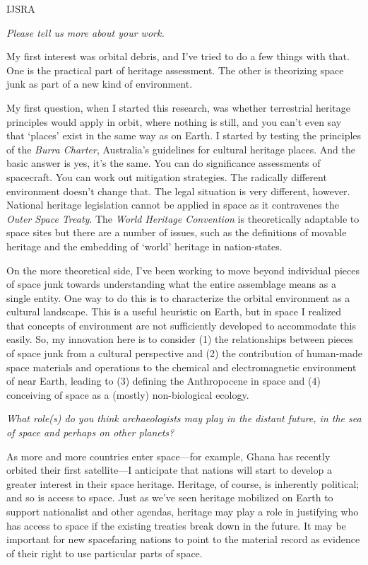 \begin{labeling}{IJSRA}
	\item[IJSRA] \emph{Please tell us more about your work.}

	\item[AG] My first interest was orbital debris, and I’ve tried to do a few things with that. One is the practical part of heritage assessment. The other is theorizing space junk as part of a new kind of environment.

	My first question, when I started this research, was whether terrestrial heritage principles would apply in orbit, where nothing is still, and you can’t even say that ‘places’ exist in the same way as on Earth. I started by testing the principles of the \emph{Burra Charter}, Australia’s guidelines for cultural heritage places. And the basic answer is yes, it’s the same. You can do significance assessments of spacecraft. You can work out mitigation strategies. The radically different environment doesn’t change that. The legal situation is very different, however. National heritage legislation cannot be applied in space as it contravenes the \emph{Outer Space Treaty}. The \emph{World Heritage Convention} is theoretically adaptable to space sites but there are a number of issues, such as the definitions of movable heritage and the embedding of ‘world’ heritage in nation-states.

	On the more theoretical side, I’ve been working to move beyond individual pieces of space junk towards understanding what the entire assemblage means as a single entity. One way to do this is to characterize the orbital environment as a cultural landscape. This is a useful heuristic on Earth, but in space I realized that concepts of environment are not sufficiently developed to accommodate this easily. So, my innovation here is to consider (1) the relationships between pieces of space junk from a cultural perspective and (2) the contribution of human-made space materials and operations to the chemical and electromagnetic environment of near Earth, leading to (3) defining the Anthropocene in space and (4) conceiving of space as a (mostly) non-biological ecology.

	\item[IJSRA] \emph{What role(s) do you think archaeologists may play in the distant future, in the sea of space and perhaps on other planets?}

	\item[AG] As more and more countries enter space—for example, Ghana has recently orbited their first satellite—I anticipate that nations will start to develop a greater interest in their space heritage. Heritage, of course, is inherently political; and so is access to space. Just as we’ve seen heritage mobilized on Earth to support nationalist and other agendas, heritage may play a role in justifying who has access to space if the existing treaties break down in the future. It may be important for new spacefaring nations to point to the material record as evidence of their right to use particular parts of space.


\end{labeling}
